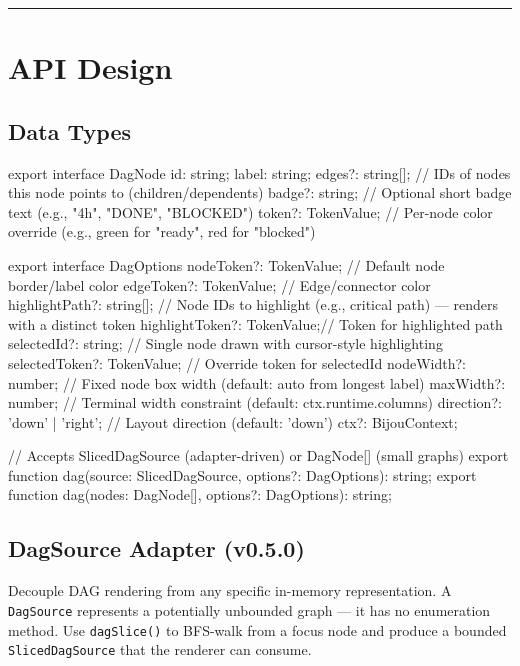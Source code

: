 \begin{center}\rule{0.5\linewidth}{0.5pt}\end{center}

\section{API Design}\label{record-426-api-design}

\subsection{Data Types}\label{record-426-data-types}

\begin{CodeBlock}
export interface DagNode {
  id: string;
  label: string;
  edges?: string[];           // IDs of nodes this node points to (children/dependents)
  badge?: string;             // Optional short badge text (e.g., "4h", "DONE", "BLOCKED")
  token?: TokenValue;         // Per-node color override (e.g., green for "ready", red for "blocked")
}

export interface DagOptions {
  nodeToken?: TokenValue;     // Default node border/label color
  edgeToken?: TokenValue;     // Edge/connector color
  highlightPath?: string[];   // Node IDs to highlight (e.g., critical path) — renders with a distinct token
  highlightToken?: TokenValue;// Token for highlighted path
  selectedId?: string;        // Single node drawn with cursor-style highlighting
  selectedToken?: TokenValue; // Override token for selectedId
  nodeWidth?: number;         // Fixed node box width (default: auto from longest label)
  maxWidth?: number;          // Terminal width constraint (default: ctx.runtime.columns)
  direction?: 'down' | 'right'; // Layout direction (default: 'down')
  ctx?: BijouContext;
}

// Accepts SlicedDagSource (adapter-driven) or DagNode[] (small graphs)
export function dag(source: SlicedDagSource, options?: DagOptions): string;
export function dag(nodes: DagNode[], options?: DagOptions): string;
\end{CodeBlock}

\subsection{DagSource Adapter (v0.5.0)}\label{record-426-dagsource-adapter-v0.5.0}

Decouple DAG rendering from any specific in-memory representation. A \texttt{D\allowbreak{}a\allowbreak{}g\allowbreak{}S\allowbreak{}o\allowbreak{}u\allowbreak{}r\allowbreak{}c\allowbreak{}e} represents a potentially unbounded graph --- it has no enumeration method. Use \texttt{d\allowbreak{}a\allowbreak{}g\allowbreak{}S\allowbreak{}l\allowbreak{}i\allowbreak{}c\allowbreak{}e\allowbreak{}(\allowbreak{})} to BFS-walk from a focus node and produce a bounded \texttt{S\allowbreak{}l\allowbreak{}i\allowbreak{}c\allowbreak{}e\allowbreak{}d\allowbreak{}D\allowbreak{}a\allowbreak{}g\allowbreak{}S\allowbreak{}o\allowbreak{}u\allowbreak{}r\allowbreak{}c\allowbreak{}e} that the renderer can consume.

